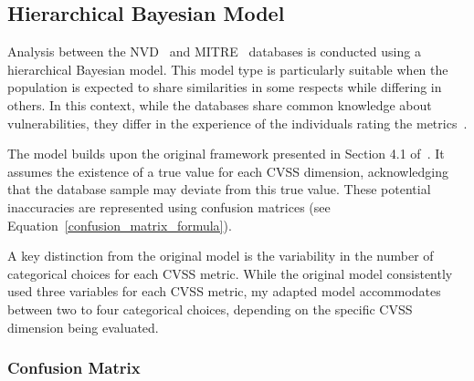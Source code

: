 \documentclass[12pt]{article}
\newcommand{\note}[2][red]{\textcolor{#1}{#2}}
\newcommand{\notedme}[1]{\note[blue]{[<Dave> #1]}}
\begin{document}

\subsection{Hierarchical Bayesian Model} \label{bayesian_modeling}

Analysis between the NVD~\cite{NVD} and MITRE~\cite{MITRE} databases is conducted using a
hierarchical Bayesian model. This model type is particularly suitable when the population is
expected to share similarities in some respects while differing in others. In this context, while
the databases share common knowledge about vulnerabilities, they differ in the experience of the
individuals rating the metrics~\cite{bayes}.

The model builds upon the original framework presented in Section 4.1 of~\cite{bayes}. It assumes
the existence of a true value for each CVSS dimension, acknowledging that the database sample may
deviate from this true value. These potential inaccuracies are represented using confusion matrices
(see Equation~\ref{confusion_matrix_formula}).

A key distinction from the original model is the variability in the number of categorical choices
for each CVSS metric. While the original model consistently used three variables for each CVSS
metric, my adapted model accommodates between two to four categorical choices, depending on the
specific CVSS dimension being evaluated.

\subsubsection{Confusion Matrix}
\end{document}
